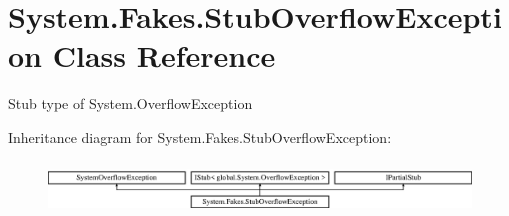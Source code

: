 \hypertarget{class_system_1_1_fakes_1_1_stub_overflow_exception}{\section{System.\-Fakes.\-Stub\-Overflow\-Exception Class Reference}
\label{class_system_1_1_fakes_1_1_stub_overflow_exception}
}


Stub type of System.\-Overflow\-Exception 


Inheritance diagram for System.\-Fakes.\-Stub\-Overflow\-Exception\-:\begin{figure}[H]
\begin{center}
\leavevmode
\includegraphics[height=1.430396cm]{class_system_1_1_fakes_1_1_stub_overflow_exception}
\end{center}
\end{figure}
